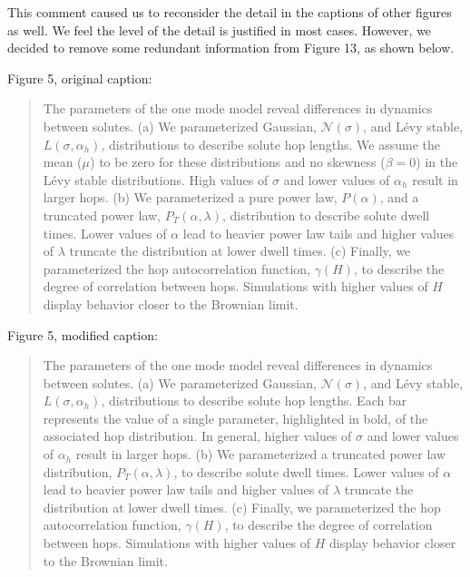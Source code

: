 \documentclass{article}
\begin{document}
\begin{enumerate}[label={Comment \theenumi :}, leftmargin=3.9\parindent]
		This comment caused us to reconsider the detail in the captions of other figures as well. We feel
		the level of the detail is justified in most cases. However, we decided to remove some redundant
		information from Figure 13, as shown below.
		
		Figure 5, original caption:
		
		\begin{quote}
		
		  The parameters of the one mode model reveal differences in dynamics
	      between solutes. (a) We parameterized Gaussian,
	      $\mathcal{N}(\sigma)$, and L\'evy stable, $L(\sigma, \alpha_h)$,
	      distributions to describe solute hop lengths. We assume the mean
	      ($\mu$) to be zero for these distributions and no
	      skewness ($\beta = 0$) in the L\'evy stable distributions. High
	      values of $\sigma$ and lower values of $\alpha_h$ result in larger
	      hops. (b) We parameterized a pure power law, $P(\alpha)$, and a
	      truncated power law, $P_T(\alpha, \lambda)$, distribution to describe
	      solute dwell times. Lower values of $\alpha$ lead to heavier power
	      law tails and higher values of $\lambda$ truncate the distribution at
	      lower dwell times. (c) Finally, we parameterized the hop
	      autocorrelation function, $\gamma(H)$, to describe the degree of
	      correlation between hops. Simulations with higher values of $H$ display
	      behavior closer to the Brownian limit.
	      
		\end{quote}
		
		Figure 5, modified caption:
		
		\begin{quote}
		
		  The parameters of the one mode model reveal differences in dynamics
	      between solutes. (a) We parameterized Gaussian, $\mathcal{N}(\sigma)$, 
	      and L\'evy stable, $L(\sigma, \alpha_h)$, distributions to describe
	      solute hop lengths. 
	      Each bar represents the value of a single parameter,
	      highlighted in bold, of the associated hop distribution.
	      In general, higher values of $\sigma$ and lower values of $\alpha_h$ 
	      result in larger hops. 
	      (b) We parameterized 
	      a truncated power law distribution, $P_T(\alpha, \lambda)$,  to describe
	      solute dwell times. 
	      Lower values of $\alpha$ lead to heavier power
	      law tails and higher values of $\lambda$ truncate the distribution at
	      lower dwell times. (c) Finally, we parameterized the hop
	      autocorrelation function, $\gamma(H)$, to describe the degree of
	      correlation between hops. Simulations with higher values of $H$ display
	      behavior closer to the Brownian limit.
	      

\end{quote}
\end{enumerate}
\end{document}
